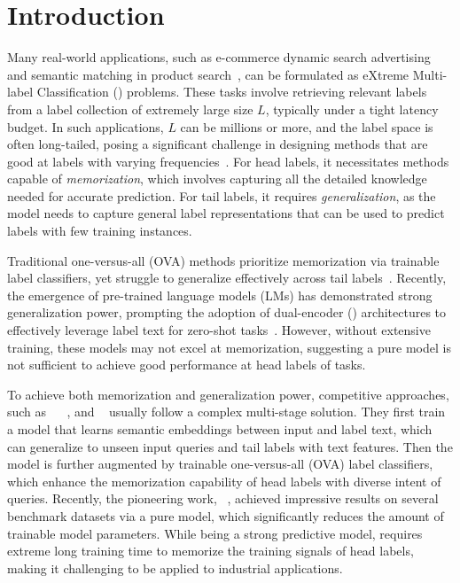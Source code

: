 \vspace{-1em}
\section{Introduction}
Many real-world applications, such as e-commerce dynamic search advertising~\citep{prabhu2018parabel} and semantic matching in product search~\citep{chang2021extreme}, can be formulated as eXtreme Multi-label Classification (\XMC) problems.
These tasks involve retrieving relevant labels from a label collection of extremely large size $L$, typically under a tight latency budget.
In such applications, $L$ can be millions or more, and the label space is often long-tailed, posing a significant challenge in designing \XMC methods that are good at labels with varying frequencies~\citep{dahiya2023ngame,gupta2024dual}.
For head labels, it necessitates methods capable of \textit{memorization}, which involves capturing all the detailed knowledge needed for accurate prediction.
For tail labels, it requires \textit{generalization}, as the model needs to capture general label representations that can be used to predict labels with few training instances.


Traditional one-versus-all (OVA) methods prioritize memorization via trainable label classifiers, yet struggle to generalize effectively across tail labels~\citep{gupta2024dual}.
Recently, the emergence of pre-trained language models (LMs) has demonstrated strong generalization power, prompting the adoption of dual-encoder (\DE) architectures to effectively leverage label text for zero-shot \XMC tasks~\citep{gupta2021generalized,xiong2021extreme,aggarwal2023semsup}.
However, without extensive training, these models may not excel at memorization, suggesting a pure \DE model is not sufficient to achieve good performance at head labels of \XMC tasks.

To achieve both memorization and generalization power, competitive \XMC approaches, such as \NGAMEova~\citep{dahiya2023ngame} \DEXAova~\citep{dahiya2023deep}, and \OAK~\citep{mohan2024oak} usually follow a complex multi-stage solution.
They first train a \DE model that learns semantic embeddings between input and label text, which can generalize to unseen input queries and tail labels with text features.
Then the \DE model is further augmented by trainable one-versus-all (OVA) label classifiers, which enhance the memorization capability of head labels with diverse intent of queries.
Recently, the pioneering work, \DEXML~\citep{gupta2024dual}, achieved impressive results on several \XMC benchmark datasets via a pure \DE model, which significantly reduces the amount of trainable model parameters.
While being a strong predictive model, \DEXML requires extreme long training time to memorize the training signals of head labels, making it challenging to be applied to industrial applications.


